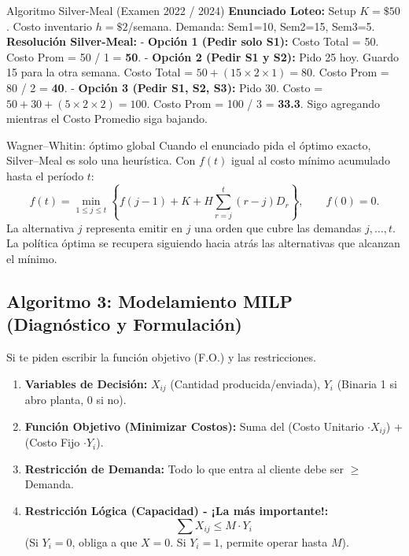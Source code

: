 \vspace{0.4cm}
\begin{ejercicio}{Algoritmo Silver-Meal (Examen 2022 / 2024)}
\textbf{Enunciado Loteo:} Setup $K = \$50$. Costo inventario $h = \$2$/semana. Demanda: Sem1=10, Sem2=15, Sem3=5.
\textbf{Resolución Silver-Meal:}
- \textbf{Opción 1 (Pedir solo S1):} Costo Total = 50. Costo Prom = 50 / 1 = \textbf{50}.
- \textbf{Opción 2 (Pedir S1 y S2):} Pido 25 hoy. Guardo 15 para la otra semana. Costo Total = $50 + (15 \times 2 \times 1) = 80$. Costo Prom = 80 / 2 = \textbf{40}.
- \textbf{Opción 3 (Pedir S1, S2, S3):} Pido 30. Costo = $50 + 30 + (5 \times 2 \times 2) = 100$. Costo Prom = 100 / 3 = \textbf{33.3}.
Sigo agregando mientras el Costo Promedio siga bajando.
\end{ejercicio}

\begin{formulas}{Wagner--Whitin: óptimo global}
Cuando el enunciado pida el óptimo exacto, Silver--Meal es solo una heurística.
Con $f(t)$ igual al costo mínimo acumulado hasta el período $t$:
\[
f(t)=\min_{1\le j\le t}\left\{f(j-1)+K+
H\sum_{r=j}^{t}(r-j)D_r\right\},\qquad f(0)=0.
\]
La alternativa $j$ representa emitir en $j$ una orden que cubre las demandas
$j,\ldots,t$. La política óptima se recupera siguiendo hacia atrás las
alternativas que alcanzan el mínimo.
\end{formulas}

\subsection{Algoritmo 3: Modelamiento MILP (Diagnóstico y Formulación)}
Si te piden escribir la función objetivo (F.O.) y las restricciones.
\begin{enumerate}
    \item \textbf{Variables de Decisión:} $X_{ij}$ (Cantidad producida/enviada), $Y_i$ (Binaria 1 si abro planta, 0 si no).
    \item \textbf{Función Objetivo (Minimizar Costos):} Suma del (Costo Unitario $\cdot X_{ij}$) + (Costo Fijo $\cdot Y_i$).
    \item \textbf{Restricción de Demanda:} Todo lo que entra al cliente debe ser $\ge$ Demanda.
    \item \textbf{Restricción Lógica (Capacidad) - ¡La más importante!:}
    $$ \sum X_{ij} \le M \cdot Y_i $$
    (Si $Y_i=0$, obliga a que $X=0$. Si $Y_i=1$, permite operar hasta $M$).
\end{enumerate}

